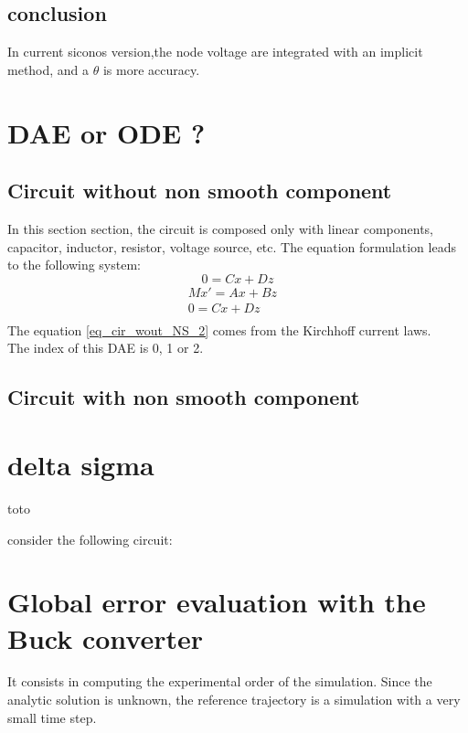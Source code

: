 \subsection{conclusion}
In current siconos version,the node voltage are integrated with an implicit method, and a $\theta$
is more accuracy.


\section{ DAE or ODE ?}

\subsection{Circuit without non smooth component}
In this section section, the circuit is composed only with linear components, capacitor, inductor,
resistor, voltage source, etc. The equation formulation leads to the following system:
\[ \]
\[0 = Cx + Dz \]
 \begin{eqnarray}
Mx'=Ax + Bz&\label{eq_cir_wout_NS_1}\\
0=Cx+ Dz &\label{eq_cir_wout_NS_2}\\
\end{eqnarray}
The equation \ref{eq_cir_wout_NS_2} comes from the Kirchhoff current laws.\\

The index of this DAE is 0, 1 or 2.
\subsection{Circuit with non smooth component}

\newpage
\section{delta sigma}
toto
\begin{figure}[h]

\end{figure}


\newpage
consider the following circuit:
\begin{figure}[h!]
\centerline{
 \scalebox{0.6}{
    
 }
}\end{figure}

\newpage
\section{Global error evaluation with the Buck converter}
It consists in computing the experimental order of the simulation. Since the analytic solution is
unknown, the reference trajectory is a simulation with a very small time step.
